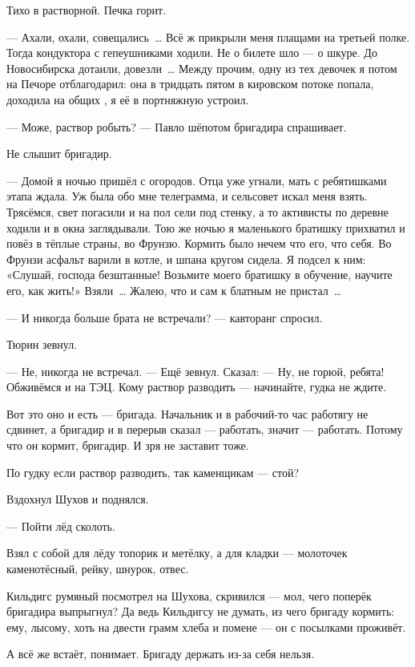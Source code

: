 Тихо в растворной. Печка горит.

--- Ахали, охали, совещались~\dots{} Всё ж прикрыли меня плащами на третьей полке. Тогда кондуктора с гепеушниками ходили. Не о билете шло --- о шкуре. До Новосибирска дотаили, довезли~\dots{} Между прочим, одну из тех девочек я потом на Печоре отблагодарил: она в тридцать пятом в кировском потоке попала, доходила на общих , я её в портняжную устроил.

--- Може, раствор робыть? --- Павло шёпотом бригадира спрашивает.

Не слышит бригадир.

--- Домой я ночью пришёл с огородов. Отца уже угнали, мать с ребятишками этапа ждала. Уж была обо мне телеграмма, и сельсовет искал меня взять. Трясёмся, свет погасили и на пол сели под стенку, а то активисты по деревне ходили и в окна заглядывали. Тою же ночью я маленького братишку прихватил и повёз в тёплые страны, во Фрунзю. Кормить было нечем что его, что себя. Во Фрунзи асфальт варили в котле, и шпана кругом сидела. Я подсел к ним: «Слушай, господа безштанные! Возьмите моего братишку в обучение, научите его, как жить!» Взяли~\dots{} Жалею, что и сам к блатным не пристал~\dots{}

--- И никогда больше брата не встречали? --- кавторанг спросил.

Тюрин зевнул.

--- Не, никогда не встречал. --- Ещё зевнул. Сказал: --- Ну, не горюй, ребята! Обживёмся и на ТЭЦ. Кому раствор разводить --- начинайте, гудка не ждите.

Вот это оно и есть --- бригада. Начальник и в рабочий-то час работягу не сдвинет, а бригадир и в перерыв сказал --- работать, значит --- работать. Потому что он кормит, бригадир. И зря не заставит тоже.

По гудку если раствор разводить, так каменщикам --- стой?

Вздохнул Шухов и поднялся.

--- Пойти лёд сколоть.

Взял с собой для лёду топорик и метёлку, а для кладки --- молоточек каменотёсный, рейку, шнурок, отвес.

Кильдигс румяный посмотрел на Шухова, скривился --- мол, чего поперёк бригадира выпрыгнул? Да ведь Кильдигсу не думать, из чего бригаду кормить: ему, лысому, хоть на двести грамм хлеба и помене --- он с посылками проживёт.

А всё же встаёт, понимает. Бригаду держать из-за себя нельзя.

